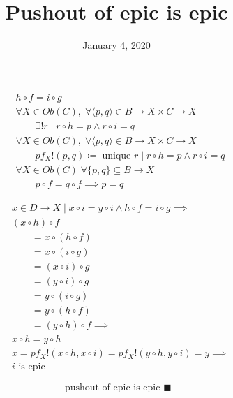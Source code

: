 \documentclass[fleqn, 11pt]{article}
\date{January 4, 2020}
\title{Pushout of epic is epic}
\begin{document}
\begin{multicols}{2}

\columnbreak

\begin{align*}
& h \circ f = i \circ g \\
& \forall X \in Ob(C),
  \; \forall \langle p, q \rangle \in B \rightarrow X \times C \rightarrow X \\
& \qquad \exists! r \mid r \circ h = p \land r \circ i = q \\
& \forall X \in Ob(C),
  \; \forall \langle p, q \rangle \in B \rightarrow X \times C \rightarrow X \\
& \qquad pf_X!(p, q) \coloneqq \text{ unique } r \mid 
                            r \circ h = p \land r \circ i = q \\
& \forall X \in Ob(C) \;
  \forall \{p, q\} \subseteq B \rightarrow X \\
& \qquad p \circ f = q \circ f \implies p = q 
\end{align*}

\end{multicols}

\begin{equation*}
\begin{aligned}
& x \in D \rightarrow X \mid x \circ i = y \circ i \land
  h \circ f = i \circ g \implies \\
& (x \circ h) \circ f \\
& \qquad = x \circ (h \circ f) \\
& \qquad = x \circ (i \circ g) \\
& \qquad = (x \circ i) \circ g \\
& \qquad = (y \circ i) \circ g \\
& \qquad = y \circ (i \circ g) \\
& \qquad = y \circ (h \circ f) \\
& \qquad = (y \circ h) \circ f \implies \\
& x \circ h = y \circ h \\
& x = pf_X!(x \circ h, x \circ i) = pf_X!(y \circ h, y \circ i) = y \implies \\
& i \text{ is epic }
\end{aligned}
\end{equation*}

\hrulefill

$$ \text{ pushout of epic is epic } \blacksquare $$
\end{document}
